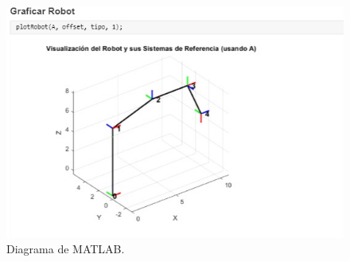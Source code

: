 \begin{figure}[htbp]
	\centering
	\includegraphics[width=0.5\linewidth]{img/EJ10}
	\caption{Diagrama de MATLAB.}
	\label{fig:ej10}
\end{figure}

\clearpage
